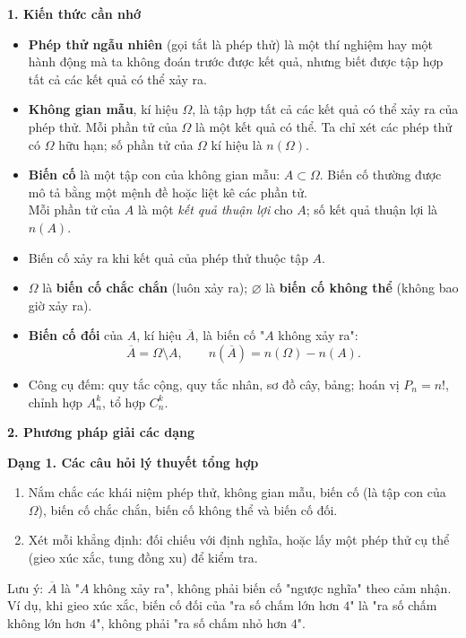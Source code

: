 \par{}\par\smallskip
\textbf{1. Kiến thức cần nhớ}
\begin{itemize}
\item \textbf{Phép thử ngẫu nhiên} (gọi tắt là phép thử) là một thí nghiệm hay một hành động mà ta không đoán trước được kết quả, nhưng biết được tập hợp tất cả các kết quả có thể xảy ra.
\item \textbf{Không gian mẫu}, kí hiệu $\Omega$, là tập hợp tất cả các kết quả có thể xảy ra của phép thử. Mỗi phần tử của $\Omega$ là một kết quả có thể. Ta chỉ xét các phép thử có $\Omega$ hữu hạn; số phần tử của $\Omega$ kí hiệu là $n(\Omega)$.
\item \textbf{Biến cố} là một tập con của không gian mẫu: $A\subset\Omega$. Biến cố thường được mô tả bằng một mệnh đề hoặc liệt kê các phần tử.\\
Mỗi phần tử của $A$ là một \emph{kết quả thuận lợi} cho $A$; số kết quả thuận lợi là $n(A)$.
\item Biến cố xảy ra khi kết quả của phép thử thuộc tập $A$.
\item $\Omega$ là \textbf{biến cố chắc chắn} (luôn xảy ra); $\varnothing$ là \textbf{biến cố không thể} (không bao giờ xảy ra).
\item \textbf{Biến cố đối} của $A$, kí hiệu $\overline{A}$, là biến cố "$A$ không xảy ra":
\[ \boxed{\overline{A}=\Omega\setminus A},\qquad \boxed{n\left(\overline{A}\right)=n(\Omega)-n(A)}. \]
\item Công cụ đếm: quy tắc cộng, quy tắc nhân, sơ đồ cây, bảng; hoán vị $P_n=n!$, chỉnh hợp $A_n^k$, tổ hợp $C_n^k$.
\end{itemize}

\textbf{2. Phương pháp giải các dạng}

\textbf{Dạng 1. Các câu hỏi lý thuyết tổng hợp}
\begin{enumerate}
\item Nắm chắc các khái niệm phép thử, không gian mẫu, biến cố (là tập con của $\Omega$), biến cố chắc chắn, biến cố không thể và biến cố đối.
\item Xét mỗi khẳng định: đối chiếu với định nghĩa, hoặc lấy một phép thử cụ thể (gieo xúc xắc, tung đồng xu) để kiểm tra.
\end{enumerate}
Lưu ý: $\overline{A}$ là "$A$ không xảy ra", không phải biến cố "ngược nghĩa" theo cảm nhận. Ví dụ, khi gieo xúc xắc, biến cố đối của "ra số chấm lớn hơn $4$" là "ra số chấm không lớn hơn $4$", không phải "ra số chấm nhỏ hơn $4$".

